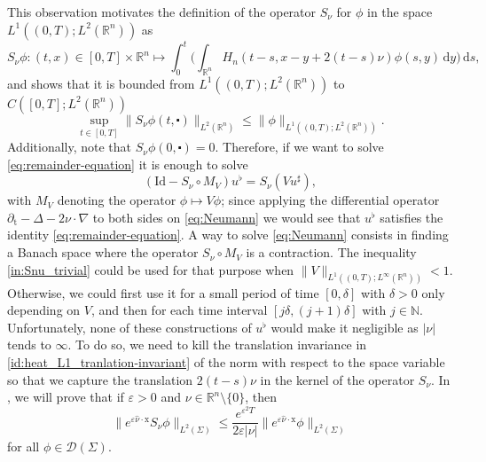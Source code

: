 \documentclass[10pt,a4paper]{amsart}
\theoremstyle{remark}
\theoremstyle{definition}
\newcommand{\R}{\mathbb{R}}
\newcommand{\N}{\mathbb{N}}
\newcommand{\dd}{\mathrm{d}}
\newcommand{\tm}{\mathrm{t}}
\newcommand{\x}{\mathrm{x}}
\newcommand{\Id}{\mathrm{Id}}
\newcommand{\marnote}[1]{\marginpar{\footnotesize #1}} %
\begin{document}
This observation motivates the definition of the operator $S_\nu$ for $\phi $
in the space $ L^1((0,T); L^2(\R^n))$ as
\[ S_\nu \phi: (t, x) \in [0, T] \times \R^n \longmapsto \int_0^t \Big( \int_{\R^n} H_n (t-s, x - y + 2(t-s) \nu) \phi(s, y) \, \dd y \Big) \, \dd s, \]
and shows that it is bounded from $ L^1((0,T); L^2(\R^n))$ to $C([0, T]; L^2(\R^n))$
\begin{equation}
\label{in:Snu_trivial}
\sup_{t \in [0, T]} \|S_\nu \phi (t, \centerdot)\|_{L^2(\R^n)} \leq \| \phi\|_{L^1((0,T); L^2(\R^n))}.
\end{equation}
Additionally, note that $S_\nu \phi (0, \centerdot)= 0$.
Therefore, if we want to solve \eqref{eq:remainder-equation} it is enough to solve
\begin{equation}
\label{eq:Neumann}
(\Id - S_\nu \circ M_V) u^\flat = S_\nu (V u^\sharp),
\end{equation}
with $M_V $ denoting the operator $ \phi \mapsto V \phi$; since applying the differential 
operator $\partial_\tm - \Delta - 2 \nu \cdot \nabla$ to both sides on 
\eqref{eq:Neumann} we would see that $u^\flat$ satisfies the identity 
\eqref{eq:remainder-equation}. A way to solve \eqref{eq:Neumann} consists in finding 
a Banach space where the operator $S_\nu \circ M_V$ is a contraction. The inequality 
\eqref{in:Snu_trivial} could be used for that purpose when 
$\| V \|_{L^1((0,T); L^\infty(\R^n))} < 1$. Otherwise, we could first use it 
for a small period of time $[0, \delta]$ with $\delta > 0$ only depending on $V$,
and then for each time interval
$[j \delta, (j+1)\delta]$ with $j \in \N$. Unfortunately, none of these constructions of $u^\flat$
would make it negligible as $|\nu|$ tends to $\infty$. To do so, we need to kill the translation
invariance in \eqref{id:heat_L1_tranlation-invariant} of the norm with respect to the space variable so 
that we capture the translation $2(t-s)\nu$ in the kernel of the operator $S_\nu$. In
, we will prove that if $\varepsilon > 0$ and $\nu \in \R^n \setminus\{ 0 \}$,
then
\begin{equation}
\label{in:Snu}
\| e^{\varepsilon \hat{\nu} \cdot \x} S_\nu \phi \|_{L^2(\Sigma)} \leq \frac{e^{\varepsilon^2 T}}{2 \varepsilon |\nu|} \| e^{\varepsilon \hat{\nu} \cdot \x} \phi \|_{L^2(\Sigma)}
\end{equation}
for all $\phi \in \mathcal{D}(\Sigma)$.
\end{document}
